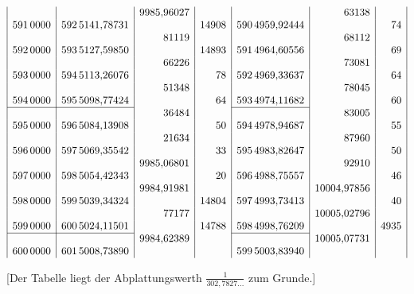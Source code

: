{\[\begin{array}{|r|r|r|r|r|r|r|}
&&9985{,}96027&&&63138&\\
591\,0000&592\,5141{,}78731&&14908&590\,4959{,}92444&&74\\
&&81119&&&68112&\\
592\,0000&593\,5127{,}59850&&14893&591\,4964{,}60556&&69\\
&&66226&&&73081&\\
593\,0000&594\,5113{,}26076&&78&592\,4969{,}33637&&64\\
&&51348&&&78045&\\
594\,0000&595\,5098{,}77424&&64&593\,4974{,}11682&&60\\
\cline{1-2}\cline{5-5}
&&36484&&&83005&\\
595\,0000&596\,5084{,}13908&&50&594\,4978{,}94687&&55\\
&&21634&&&87960&\\
596\,0000&597\,5069{,}35542&&33&595\,4983{,}82647&&50\\
&&9985{,}06801&&&92910&\\
597\,0000&598\,5054{,}42343&&20&596\,4988{,}75557&&46\\
&&9984{,}91981&&&10004{,}97856&\\
598\,0000&599\,5039{,}34324&&14804&597\,4993{,}73413&&40\\
&&77177&&&10005{,}02796&\\
599\,0000&600\,5024{,}11501&&14788&598\,4998{,}76209&&4935\\
\cline{1-2}\cline{5-5}
&&9984{,}62389&&&10005{,}07731&\\
600\,0000&601\,5008{,}73890&&&599\,5003{,}83940&&\\
\end{array}\]
}
\begin{center}[Der Tabelle liegt der Abplattungswerth \(\frac1{302{,}7827\ldots}\) zum Grunde.]\end{center}


